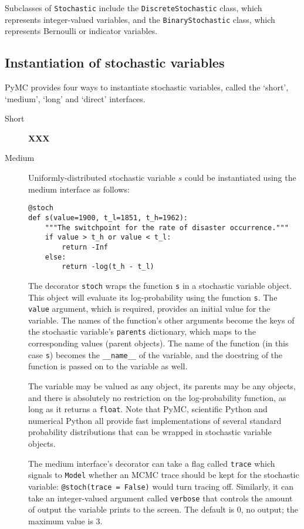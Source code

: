 Subclasses of \texttt{Stochastic} include the \texttt{DiscreteStochastic} class, which represents integer-valued variables, and the \texttt{BinaryStochastic} class, which represents Bernoulli or indicator variables. 

\subsection{Instantiation of stochastic variables}
PyMC provides four ways to instantiate stochastic variables, called the `short', `medium', `long' and `direct' interfaces.
\begin{description}
    \item[Short] \textbf{XXX}
    \item[Medium] Uniformly-distributed stochastic variable $s$ could be instantiated using the medium interface as follows:
    \begin{verbatim}
@stoch
def s(value=1900, t_l=1851, t_h=1962):
    """The switchpoint for the rate of disaster occurrence."""
    if value > t_h or value < t_l:
        return -Inf
    else:
        return -log(t_h - t_l) 
    \end{verbatim}
    The decorator \texttt{stoch} wraps the function \texttt{s} in a stochastic variable object. This object will evaluate its log-probability using the function \texttt{s}. The \texttt{value} argument, which is required, provides an initial value for the variable. The names of the function's other arguments become the keys of the stochastic variable's \texttt{parents} dictionary, which maps to the corresponding values (parent objects). The name of the function (in this case \texttt{s}) becomes the \texttt{\_\_name\_\_} of the variable, and the docstring of the function is passed on to the variable as well.

The variable may be valued as any object, its parents may be any objects, and there is absolutely no restriction on the log-probability function, as long as it returns a \texttt{float}. Note that PyMC, scientific Python and numerical Python all provide fast implementations of several standard probability distributions that can be wrapped in stochastic variable objects.

    The medium interface's decorator can take a flag called \texttt{trace} which signals to \texttt{Model} whether an MCMC trace should be kept for the stochastic variable: \texttt{@stoch(trace = False)} would turn tracing off. Similarly, it can take an integer-valued argument called \texttt{verbose} that controls the amount of output the variable prints to the screen. The default is $0$, no output; the maximum value is 3.


\end{description}
